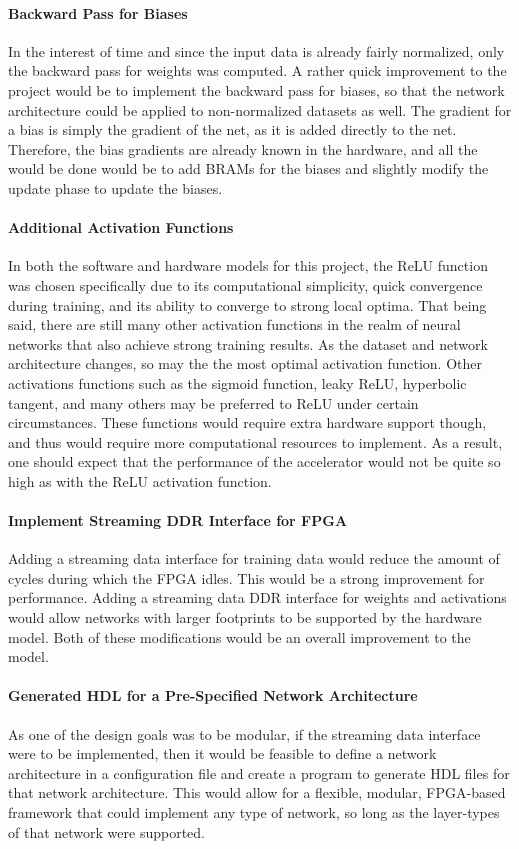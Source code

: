 \paragraph{Backward Pass for Biases}
In the interest of time and since the input data is already fairly normalized, only the backward pass for weights was computed. A rather quick improvement to the project would be to implement the backward pass for biases, so that the network architecture could be applied to non-normalized datasets as well. The gradient for a bias is simply the gradient of the net, as it is added directly to the net. Therefore, the bias gradients are already known in the hardware, and all the would be done would be to add BRAMs for the biases and slightly modify the update phase to update the biases.

\paragraph{Additional Activation Functions}
In both the software and hardware models for this project, the ReLU function was chosen specifically due to its computational simplicity, quick convergence during training, and its ability to converge to strong local optima. That being said, there are still many other activation functions in the realm of neural networks that also achieve strong training results. As the dataset and network architecture changes, so may the the most optimal activation function. Other activations functions such as the sigmoid function, leaky ReLU, hyperbolic tangent, and many others may be preferred to ReLU under certain circumstances. These functions would require extra hardware support though, and thus would require more computational resources to implement. As a result, one should expect that the performance of the accelerator would not be quite so high as with the ReLU activation function.

\paragraph{Implement Streaming DDR Interface for FPGA}
Adding a streaming data interface for training data would reduce the amount of cycles during which the FPGA idles. This would be a strong improvement for performance. Adding a streaming data DDR interface for weights and activations would allow networks with larger footprints to be supported by the hardware model. Both of these modifications would be an overall improvement to the model.

\paragraph{Generated HDL for a Pre-Specified Network Architecture}
As one of the design goals was to be modular, if the streaming data interface were to be implemented, then it would be feasible to define a network architecture in a configuration file and create a program to generate HDL files for that network architecture. This would allow for a flexible, modular, FPGA-based framework that could implement any type of network, so long as the layer-types of that network were supported.
